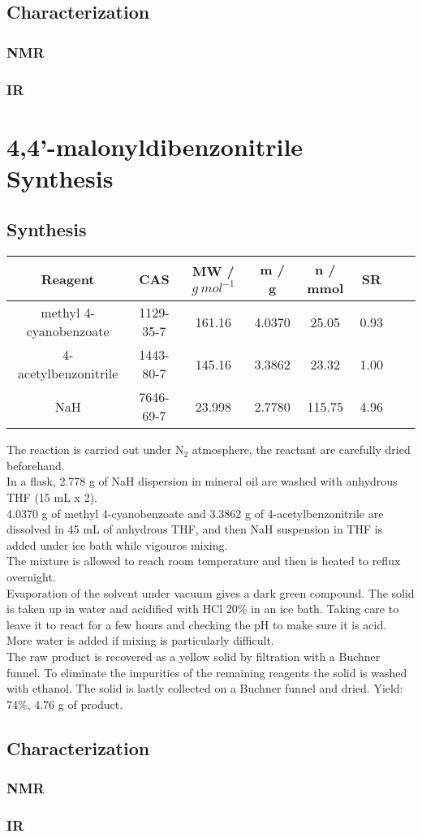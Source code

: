 \documentclass[../Master.tex]{subfiles}
\begin{document}
\subsection{Characterization}
\subsubsection{NMR}
\subsubsection{IR}
\section{4,4'-malonyldibenzonitrile Synthesis}
\subsection{Synthesis}
\begin{center}
	\begin{tabular}[b]{cccccccc}
		\toprule
		Reagent                & CAS       & MW / \(g \ mol^{-1}\) & m / g  & n / mmol & SR   \\
		\midrule
		methyl 4-cyanobenzoate & 1129-35-7 & 161.16                & 4.0370 & 25.05    & 0.93 \\
		4-acetylbenzonitrile   & 1443-80-7 & 145.16                & 3.3862 & 23.32    & 1.00 \\
		NaH                    & 7646-69-7 & 23.998                & 2.7780 & 115.75   & 4.96 \\
		\bottomrule
	\end{tabular}
\end{center}
The reaction is carried out under N$_{2}$ atmosphere, the reactant are carefully dried beforehand.\\
In a flask, 2.778 g of NaH dispersion in mineral oil are washed with anhydrous THF (15 mL x 2).\\
4.0370 g of methyl 4-cyanobenzoate and 3.3862 g of 4-acetylbenzonitrile are dissolved in 45 mL of anhydrous THF, and then NaH suspension in THF is added under ice bath while vigouros mixing. \\
The mixture is allowed to reach room temperature and then is heated to reflux overnight. \\
Evaporation of the solvent under vacuum gives a dark green compound. The solid is taken up in water and acidified with HCl 20\% in an ice bath. Taking care to leave it to react for a few hours and checking the pH to make sure it is acid. More water is added if mixing is particularly difficult.\\
The raw product is recovered as a yellow solid by filtration with a Buchner funnel.
To eliminate the impurities of the remaining reagents the solid is washed with ethanol. The solid is lastly collected on a Buchner funnel and dried. Yield: 74\%, 4.76 g of product.

\subsection{Characterization}
\subsubsection{NMR}
\subsubsection{IR}
\end{document}
